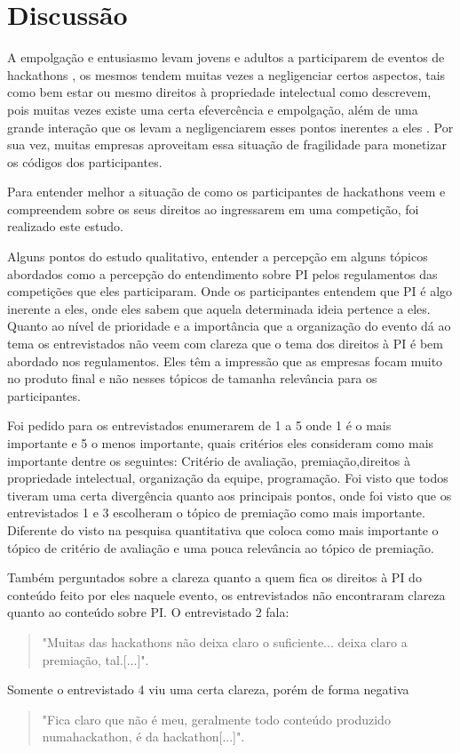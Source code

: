 \chapter{Discussão}
\label{chp:Discussão}

A empolgação e entusiasmo levam jovens e adultos a participarem de eventos de hackathons \citep{zukin2017hackathons}, os mesmos tendem muitas vezes a negligenciar certos aspectos, tais como bem estar ou mesmo direitos à propriedade intelectual como \citet{zukin2017hackathons} descrevem, pois muitas vezes existe uma certa efevercência e empolgação, além de uma grande interação que os levam a negligenciarem esses pontos inerentes a eles \citep{zukin2017hackathons} \citep{pompa2013allen}. Por sua vez, muitas empresas aproveitam essa situação de fragilidade para monetizar os códigos dos participantes. \citep{pompa2013allen}

Para entender melhor a situação de como os participantes de hackathons veem e compreendem sobre os seus direitos ao ingressarem em uma competição, foi realizado este estudo. 


Alguns pontos do estudo qualitativo, entender a percepção em alguns tópicos abordados como a percepção do entendimento sobre PI pelos regulamentos das competições que eles participaram. Onde os participantes entendem que PI é algo inerente a eles, onde eles sabem que aquela determinada ideia pertence a eles. Quanto ao nível de prioridade e a importância que a organização do evento dá ao tema os entrevistados não veem com clareza que o tema dos direitos à PI é bem abordado nos regulamentos. Eles têm a impressão que as empresas focam muito no produto final e não nesses tópicos de tamanha relevância para os participantes.

Foi pedido para os entrevistados enumerarem de 1 a 5 onde 1 é o mais importante e 5 o menos importante, quais critérios eles consideram como mais importante dentre os seguintes: Critério de avaliação, premiação,direitos à propriedade intelectual, organização da equipe, programação. Foi visto que todos tiveram uma certa divergência quanto aos principais pontos, onde foi visto que os entrevistados 1 e 3 escolheram o tópico de premiação como mais importante. Diferente do visto na pesquisa quantitativa que coloca como mais importante o tópico de critério de avaliação e uma pouca relevância ao tópico de premiação.


Também perguntados sobre a clareza quanto a quem fica os direitos à PI do conteúdo feito por eles naquele evento, os entrevistados não encontraram clareza quanto ao conteúdo sobre PI. O entrevistado 2 fala: \begin{quote}
    "Muitas das hackathons não deixa claro o suficiente... deixa claro a premiação, tal.[...]". 
\end{quote}
Somente o entrevistado 4 viu uma certa clareza, porém de forma negativa \begin{quote}
    "Fica claro que não é meu, geralmente todo conteúdo produzido numahackathon, é da hackathon[...]". 
\end{quote}

